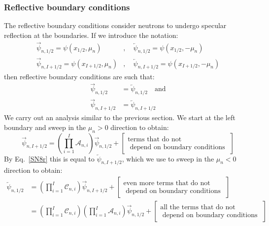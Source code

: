\documentclass{article}
\begin{document}
\subsubsection{Reflective boundary conditions}
The reflective boundary conditions consider neutrons to undergo specular reflection at the boundaries. If we introduce the notation:
\begin{align*}
    \overrightarrow{\psi}_{n,1/2}=\psi(x_{1/2},\mu_n)&,\quad
    \overleftarrow{\psi}_{n,1/2}=\psi(x_{1/2},-\mu_n) \\
    \overrightarrow{\psi}_{n,I+1/2}=\psi(x_{I+1/2},\mu_n)&,\quad
    \overleftarrow{\psi}_{n,I+1/2}=\psi(x_{I+1/2},-\mu_n)
\end{align*}
then reflective boundary conditions are such that:
\begin{align}
    \overrightarrow{\psi}_{n,1/2}&=\overleftarrow{\psi}_{n,1/2}\quad\text{and} \label{SN8l} \\
    \overrightarrow{\psi}_{n,I+1/2}&=\overleftarrow{\psi}_{n,I+1/2} \label{SN8r}
\end{align}
We carry out an analysis similar to the previous section. We start at the left boundary and sweep in the $\mu_n>0$ direction to obtain:
\begin{equation}
    \overrightarrow{\psi}_{n,I+1/2}=\left(\prod_{i=1}^I\mathcal{A}_{n,i}\right)\overrightarrow{\psi}_{n,1/2}+
    \begin{bmatrix}
        \text{terms that do not} \\
        \text{ depend on boundary conditions }
    \end{bmatrix}
\end{equation}
By Eq.~\eqref{SN8r} this is equal to $\overleftarrow{\psi}_{n,I+1/2}$, which we use to sweep in the $\mu_n<0$ direction to obtain:
\begin{align}
    \overleftarrow{\psi}_{n,1/2}&=\left(\prod_{i=1}^I\mathcal{C}_{n,i}\right)\overrightarrow{\psi}_{n,I+1/2}+
    \begin{bmatrix}
        \text{even more terms that do not} \\
        \text{ depend on boundary conditions }
    \end{bmatrix} \\
    &=\left(\prod_{i=1}^I\mathcal{C}_{n,i}\right)\left(\prod_{i=1}^I\mathcal{A}_{n,i}\right)\overrightarrow{\psi}_{n,1/2}+
    \begin{bmatrix}
        \text{all the terms that do not} \\
        \text{ depend on boundary conditions }
    \end{bmatrix}
\end{align}
\end{document}
